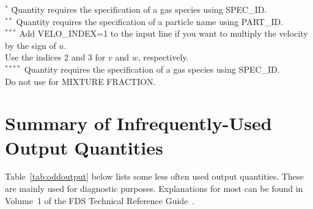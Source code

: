 \documentclass[11pt]{book}
\begin{document}
\noindent
\begin{tabbing}
$^{*}$  \hspace{0.25in} \= Quantity requires the specification of a gas species using {\ct SPEC\_ID}. \\
$^{**}$                \> Quantity requires the specification of a particle name using {\ct PART\_ID}. \\
$^{***}$               \> Add {\ct VELO\_INDEX=1} to the input line if you want to multiply the velocity by the sign of $u$. \\
                       \> Use the indices 2 and 3 for $v$ and $w$, respectively.\\
$^{****}$              \> Quantity requires the specification of a gas species using {\ct SPEC\_ID}. \\
                       \> Do not use for {\ct MIXTURE FRACTION}.
\end{tabbing}


\clearpage
\section{Summary of Infrequently-Used Output Quantities}
\label{info:oddoutputquantities}

Table~\ref{tab:oddoutput} below lists some less often used output quantities. These are mainly used for diagnostic purposes. Explanations for most can
be found in Volume~1 of the FDS Technical Reference Guide~\cite{FDS_Math_Guide}.
\end{document}
